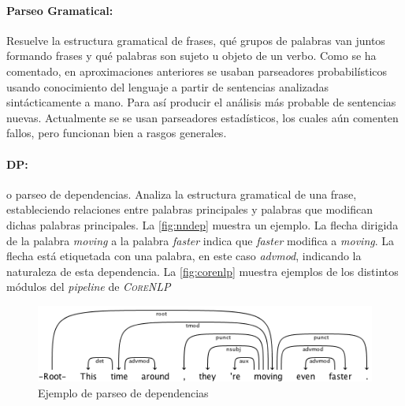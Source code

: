 \paragraph{Parseo Gramatical:}Resuelve la estructura gramatical de frases, \eg
qué grupos de palabras van juntos formando frases y qué palabras son sujeto u
objeto de un verbo. Como se ha comentado, en aproximaciones anteriores se usaban
parseadores probabilísticos usando conocimiento del lenguaje a partir de
sentencias analizadas sintácticamente a mano. Para así producir el análisis más
probable de sentencias nuevas. Actualmente se se usan parseadores estadísticos,
los cuales aún comenten fallos, pero funcionan bien a rasgos generales.

\paragraph{DP:} o parseo de dependencias. Analiza la
estructura gramatical de una frase, estableciendo relaciones entre palabras
principales y palabras que modifican dichas palabras principales. La
\autoref{fig:nndep} muestra un ejemplo. La flecha dirigida de la palabra
\emph{moving} a la palabra \emph{faster} indica que \emph{faster} modifica a
\emph{moving}. La flecha está etiquetada con una palabra, en este caso
\emph{advmod}, indicando la naturaleza de esta dependencia. La
\autoref{fig:corenlp} muestra ejemplos de los distintos módulos del
\emph{pipeline} de \emph{\textsc{CoreNLP}}

\begin{figure}[bth]
  \includegraphics[width=1\linewidth]{gfx/nndep-example}
  \caption[Ejemplo de parseo de dependencias]{Ejemplo de parseo de dependencias}
  \label{fig:nndep}
\end{figure}

